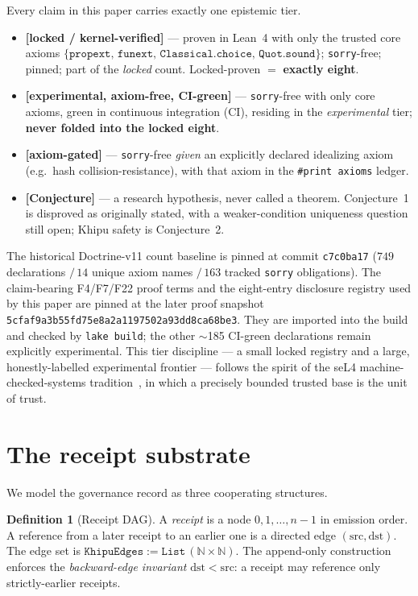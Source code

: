 \documentclass[11pt,letterpaper]{article}
\theoremstyle{definition}
\newtheorem{definition}[theorem]{Definition}
\newcommand{\kernelaxioms}{\{\texttt{propext},\,\texttt{funext},\,\texttt{Classical.choice},\,\texttt{Quot.sound}\}}
\begin{document}
Every claim in this paper carries exactly one epistemic tier.

\begin{itemize}
\item \textbf{[locked / kernel-verified]} --- proven in Lean~4 with only the
  trusted core axioms $\kernelaxioms$; \texttt{sorry}-free; pinned; part of the
  \emph{locked} count. Locked-proven $=$ \textbf{exactly eight}.
\item \textbf{[experimental, axiom-free, CI-green]} --- \texttt{sorry}-free with
  only core axioms, green in continuous integration (CI), residing in the
  \emph{experimental} tier; \textbf{never folded into the locked eight}.
\item \textbf{[axiom-gated]} --- \texttt{sorry}-free \emph{given} an explicitly
  declared idealizing axiom (e.g.\ hash collision-resistance), with that axiom
  in the \texttt{\#print axioms} ledger.
\item \textbf{[Conjecture]} --- a research hypothesis, never called a theorem.
  Conjecture~1 is disproved as originally stated, with a weaker-condition
  uniqueness question still open; Khipu safety is Conjecture~2.
\end{itemize}

\noindent The historical Doctrine-v11 count baseline is pinned at commit
\texttt{c7c0ba17} ($749$ declarations $/\,14$ unique axiom names $/\,163$
tracked \texttt{sorry} obligations). The claim-bearing F4/F7/F22 proof terms
and the eight-entry disclosure registry used by this paper are pinned at the
later proof snapshot \texttt{5cfaf9a3b55fd75e8a2a1197502a93dd8ca68be3}.
They are imported into the build and checked by \texttt{lake build}; the other
$\sim$185 CI-green declarations remain explicitly experimental. This tier
discipline --- a small locked registry and a large, honestly-labelled
experimental frontier --- follows the spirit of the seL4
machine-checked-systems tradition~\cite{sel4}, in which a precisely bounded
trusted base is the unit of trust.

\section{The receipt substrate}\label{sec:substrate}

We model the governance record as three cooperating structures.

\begin{definition}[Receipt DAG]
A \emph{receipt} is a node $0,1,\dots,n-1$ in emission order. A reference from a
later receipt to an earlier one is a directed edge $(\mathrm{src},
\mathrm{dst})$. The edge set is $\texttt{KhipuEdges} := \texttt{List}\,(\mathbb{N}
\times \mathbb{N})$. The append-only construction enforces the
\emph{backward-edge invariant} $\mathrm{dst} < \mathrm{src}$: a receipt may
reference only strictly-earlier receipts.
\end{definition}
\end{document}
